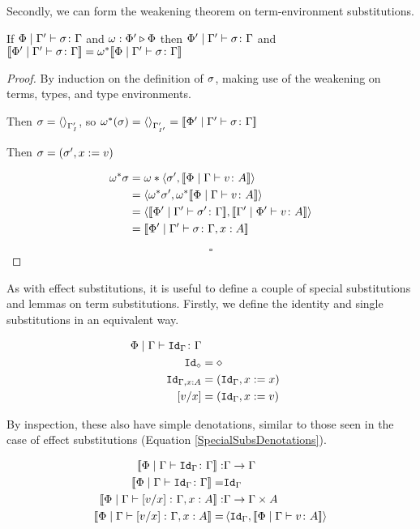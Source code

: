 \documentclass{Report}
\begin{document}
Secondly, we can form the weakening theorem on term-environment substitutions.


\begin{theorem}
    If $\etyperelation{\P}{\G'}{\si}{\G}$ and $\wrelw{\P'}{\P}$ then $\etyperelation{\P'}{\G'}{\si}{\G}$ and $\deno{\etyperelation{\P'}{\G'}{\si}{\G}} = \w\star\deno{\etyperelation{\P}{\G'}{\si}{\G}}$
\end{theorem}

\begin{proof}
    By induction on the definition of $\si$, making use of the weakening on terms, types, and type environments.

    Then $\si = \term{\G'_{I}}$, so $\w\star(\si) = \term{\G'_{I'}} = \deno{\etyperelation{\P'}{\G'}{\si}{\G}}$
    
    Then $\si = (\si',x\setto v)$
    
    \begin{align}
        \w\star\si & = \w*\pr{\si'}{\deno{\gpetyperelation{v}{A}}}\\
        & = \pr{\w\star\si'}{\w\star\deno{\gpetyperelation{v}{A}}}\\
        &=\pr{\deno{\etyperelation{\P'}{\G'}{\si'}{\G}}}{\deno{\etyperelation{\G'}{\P'}{v}{A}}}\\
        &=\deno{\etyperelation{\P'}{\G'}{\si}{\gax}}
    \end{align}

    $$\square$$

\end{proof}

As with effect substitutions, it is useful to define a couple of special substitutions and lemmas on term substitutions. Firstly, we define the identity and single substitutions in an equivalent way.

\begin{align}
    \etyperelation{\P}{\G}{\Id{\G}}{\G}\\
    \Id{\nil} & = \nil\\
    \Id{\gax} & = (\idg, x\setto x)\\
    \ssub{x}{v} & = (\idg, x\setto v)\\
\end{align}

By inspection, these also have simple denotations, similar to those seen in the case of effect substitutions (Equation \ref{SpecialSubsDenotations}).

\begin{align}
    \deno{\etyperelation{\P}{\G}{\Id{\G}}{\G}}: & \G\rightarrow\G\\
    \deno{\etyperelation{\P}{\G}{\Id{\G}}{\G}} = &  \idg\\
    \deno{\etyperelation{\P}{\G}{\ssub{x}{v}}{\gax}}: & \G\rightarrow \G\times A\\
    \deno{\etyperelation{\P}{\G}{\ssub{x}{v}}{\gax}} = & \pr{\idg}{\deno{\gpetyperelation{v}{A}}}
\end{align}
\end{document}
